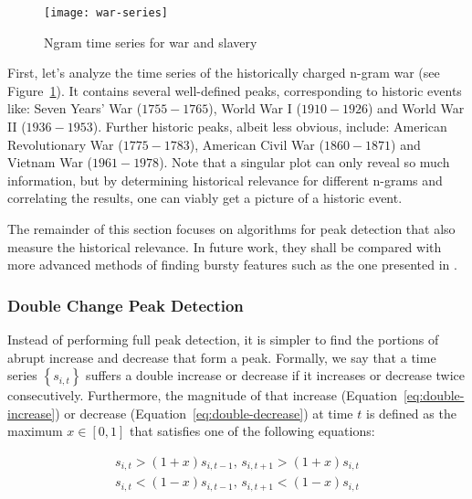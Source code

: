 
\begin{figure}[t]
\centering
\texttt{[image: war-series]}
\caption{Ngram time series for war and slavery}
\label{fig:war-series}
\end{figure}


First, let's analyze the time series of the historically charged n-gram war (see Figure~\ref{fig:war-series}). It contains several well-defined peaks, corresponding to historic events like: Seven Years' War ($1755 - 1765$), World War I ($1910 - 1926$) and World War II ($1936 - 1953$). Further historic peaks, albeit less obvious, include: American Revolutionary War ($1775 - 1783$), American Civil War ($1860 - 1871$) and Vietnam War ($1961 - 1978$). Note that a singular plot can only reveal so much information, but by determining historical relevance for different n-grams and correlating the results, one can viably get a picture of a historic event.

The remainder of this section focuses on algorithms for peak detection that also measure the historical relevance. In future work, they shall be compared with more advanced methods of finding bursty features such as the one presented in .

\subsubsection{Double Change Peak Detection}

Instead of performing full peak detection, it is simpler to find the portions of abrupt increase and decrease that form a peak. Formally, we say that a time series $\left\{ s_{i, t} \right\}$ suffers a double increase or decrease if it increases or decrease twice consecutively. Furthermore, the magnitude of that increase (Equation~\ref{eq:double-increase}) or decrease (Equation~\ref{eq:double-decrease}) at time $t$ is defined as the maximum $x \in \left[ 0, 1 \right]$ that satisfies one of the following equations:

\begin{align}
\label{eq:double-increase}
s_{i, t} > \left( 1 + x \right) s_{i, t - 1}, \, s_{i, t + 1} > \left( 1 + x \right) s_{i, t}
\\
\label{eq:double-decrease}
s_{i, t} < \left( 1 - x \right) s_{i, t - 1}, \, s_{i, t + 1} < \left( 1 - x \right) s_{i, t}
\end{align}

